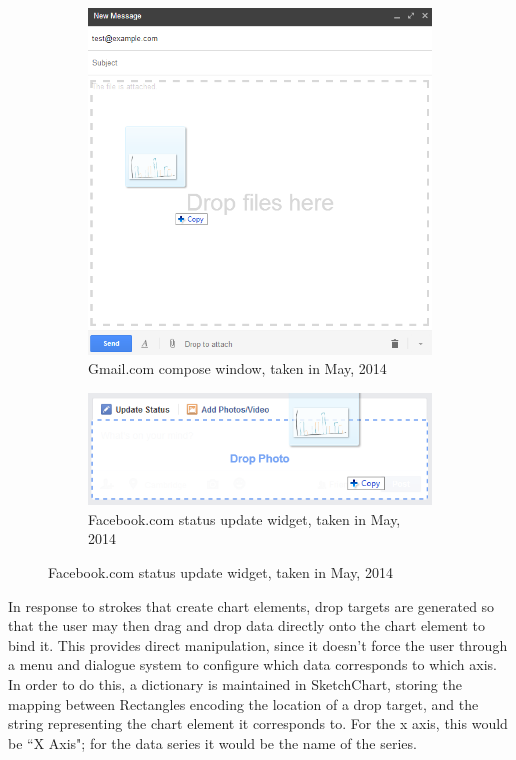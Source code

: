	\begin{figure}[h]
		\centering
		\begin{subfigure}[b]{0.4\textwidth}
			\includegraphics[width=\textwidth]{dropexample1}
			\caption{Gmail.com compose window, taken in May, 2014}
			\label{fig:dropexample1}
		\end{subfigure}
		\begin{subfigure}[b]{0.4\textwidth}
			\includegraphics[width=\textwidth]{dropexample2}
			\caption{Facebook.com status update widget, taken in May, 2014}
			\label{fig:dropexample2}
		\end{subfigure}

	\end{figure}
	
	In response to strokes that create chart elements, drop targets are generated so that the user may then drag and drop data directly onto the chart element to bind it. This provides direct manipulation, since it doesn't force the user through a menu and dialogue system to configure which data corresponds to which axis. In order to do this, a dictionary is maintained in SketchChart, storing the mapping between Rectangles encoding the location of a drop target, and the string representing the chart element it corresponds to. For the x axis, this would be ``X Axis"; for the data series it would be the name of the series. 
	
